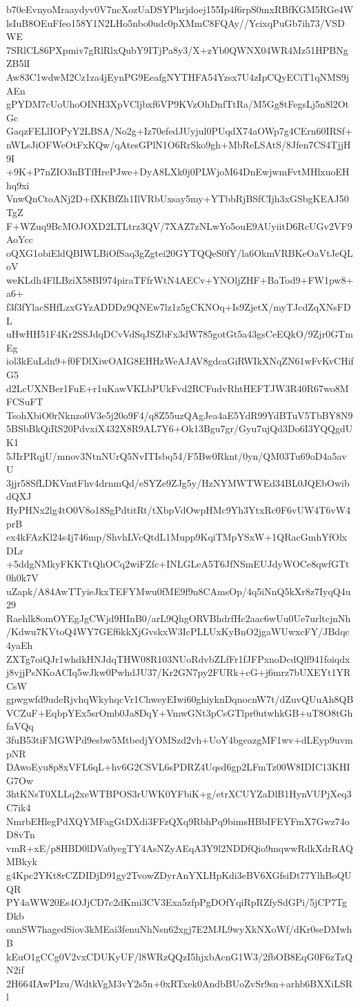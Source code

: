 b70eEvnyoMraaydyv0V7ncXozUaDSYPhrjdoej155Ip4f6rpS0mxRBfKGM5RGe4W
lsIuB8OEuFfeo158Y1N2LHo5nbo0udc0pXMmC8FQAy//YcixqPuGb7ih73/VSDWE
7SRlCL86PXpmiv7gRlRlxQubY9ITjPa8y3/X+zYb0QWNX04WR4Mz51HPBNgZB5lI
Aw83C1wdwM2Cz1za4jEynPG9EeafgNYTHFA54Yzsx7U4zIpCQyECiT1qNMS9jAEn
gPYDM7cUoUhoOINH3XpVCljbxf6VP9KVzOhDnfTtRa/M5Gg8tFegsLj5n8l2OtGc
GaqzFELlIOPyY2LBSA/No2g+Iz70efedJUyjul0PUqdX74aOWp7g4CErn60IRSf+
nWLsJiOFWeOtFxKQw/qAtesGPlN1O6RrSko9gh+MbReLSAtS/8Jfen7CS4TjjH9I
+9K+P7nZIO3nBTfHrePJwe+DyA8LXk0j0PLWjoM64DnEwjwmFvtMHlxuoEHhq9xi
VnwQnCtoANj2D+fXKBfZh1IlVRbUxsay5my+YTbbRjBSfCIjh3xGSbgKEAJ50TgZ
F+WZuq9BcMOJOXD2LTLtrz3QV/7XAZ7zNLwYo5ouE9AUyiitD6RcUGv2VF9AoYcc
oQXG1obiEldQBIWLBiOfSaq3gZgtei20GYTQQeS0fY/la6OkmVRBKeOaVtJeQLoV
weKLdh4FlLBziX58BI974piraTFfrWtN4AECv+YNOljZHF+BaTod9+FW1pw8+a6+
f3f3fYlacSHfLzxGYzADDDz9QNEw7lz1z5gCKNOq+Is9ZjetX/myTJcdZqXNsFDL
uHwHH51F4Kr2SSJdqDCvVdSqJSZbFx3dW785gotGt5a43gsCeEQkO/9Zjr0GTmEg
iol3kEuLdn9+f0FDlXiwOAIG8EHHzWeAJAV8gdcaGiRWIkXNqZN61wFvKvCHifG5
d2LcUXNBer1FuE+r1uKawVKLbPUkFvd2RCFudvRhtHEFTJW3R40R67wo8MFCSuFT
TsohXbiO0rNknzo0V3e5j20o9F4/q8Z55uzQAgJea4aE5YdR99YdBTuV5TbBY8N9
5BSbBkQiRS20PdvxiX432X8R9AL7Y6+Ok13Bgu7gr/Gyu7ujQd3Do6I3YQQgdUK1
5JIrPRqjU/mnov3NtnNUrQ5NvITIsbq54/F5Bw0Rknt/0yn/QM03Tu69oD4a5avU
3jjr58SfLDKVmtFhv4drnmQd/eSYZe9ZJg5y/HzNYMWTWEd34BL0JQEbOwibdQXJ
HyPHNx2lg4tO0V8o18SgPdtitRt/tXbpVdOwpHMc9Yh3YtxRc0F6vUW4T6vW4prB
ex4kFAzKl24s4j746mp/ShvhLVcQtdL1Mupp9KqiTMpYSxW+1QRacGmhYfOlxDLr
+5ddgNMkyFKKTtQhOCq2wiFZfc+INLGLeA5T6JfNSmEUJdyWOCe8qwfGTt0h0k7V
uZapk/A84AwTTyieJkxTEFYMwu0fME9f9n8CAmsOp/4q5iNnQ5kXr8z7IyqQ4u29
Raehlk8omOYEgJgCWjd9HInB0/arL9QhgORVBhdrfHc2aac6wUu0Ue7urltcjnNh
/Kdwu7KVtoQ4WY7GEf6kkXjGvskxW3IcPLLUxKyBnO2jgaWUwxcFY/JBdqc4yaEh
ZXTg7oiQJr1whdkHNJdqTHW08R103NUoRdvbZLfFr1fJFPxnoDcdQlf941foiqdx
j8vjjPsNKoACIq5wJkw0PwhdJU37/Kr2GN7py2FURk+cG+j6mrz7bUXEYt1YRCsW
gpwgwfd9udeRjvhqWkyhqcVr1ChweyEIwi60ghiyknDqnocnW7t/dZuvQUuAh8QB
VCZuF+EqbpYEx5srOmb0Ja8DqY+VmwGNt3pCsGTlpr0utwhkGB+uT8O8tGhfaVQq
3fuB53tiFMGWPd9esbw5MtbedjYOMSzd2vh+UoY4bgeazgMF1wv+dLEyp9uvmpNR
DAwoEyu8p8xVFL6qL+hv6G2CSVL6sPDRZ4Uqsd6gp2LFmTz00W8IDIC13KHIG7Ow
3htKNsT0XLLq2xeWTBPOS3rUWK0YFbiK+g/etrXCUYZaDlB1HynVUPjXeq3C7ik4
NmrbEHlegPdXQYMFagGtDXdi3FFzQXq9RbhPq9bimsHBbIFEYFmX7Gwz74oD8vTn
vmR+xE/p8HBD0lDVa0yegTY4AsNZyAEqA3Y9l2NDDfQio9mqwwRdkXdrRAQMBkyk
g4Kpc2YKt8rCZDIDjD91gy2TvowZDyrAnYXLHpKdi3eBV6XGfsiDt77YlhBoQUQR
PY4aWW20Es4OJjCD7c2dKmi3CV3Exa5zfpPgDOfYqiRpRZfySdGPi/5jCP7TgDkb
onnSW7hagedSiov3kMEai3fenuNhNsn62xgj7E2MJL9wyXkNXoWf/dKr0seDMwhB
kEuO1gCCg0V2vxCDUKyUF/l8WRzQQzI5hjxbAcnG1W3/2fbOB8EqG0F6zTzQN2if
2H664IAwPIzu/WdtkVgM3vY2s5n+0xRTxek0AndbBUoZvSr9sn+arhb6BXXiLSRl
